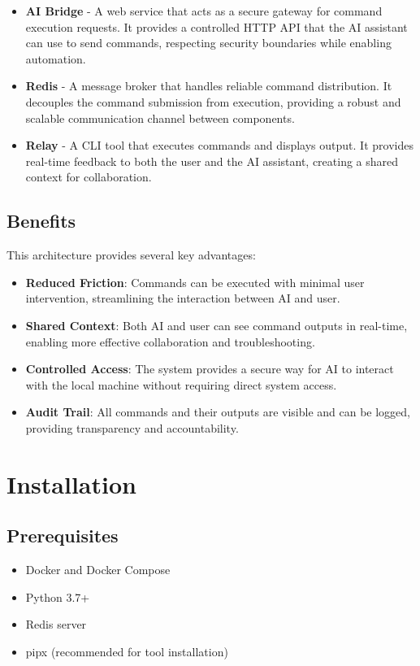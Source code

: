 \documentclass{article}
\begin{document}
\begin{itemize}
    \item \textbf{AI Bridge} - A web service that acts as a secure gateway for command execution requests. It provides a controlled HTTP API that the AI assistant can use to send commands, respecting security boundaries while enabling automation.
    
    \item \textbf{Redis} - A message broker that handles reliable command distribution. It decouples the command submission from execution, providing a robust and scalable communication channel between components.
    
    \item \textbf{Relay} - A CLI tool that executes commands and displays output. It provides real-time feedback to both the user and the AI assistant, creating a shared context for collaboration.
\end{itemize}

\subsection{Benefits}
This architecture provides several key advantages:

\begin{itemize}
    \item \textbf{Reduced Friction}: Commands can be executed with minimal user intervention, streamlining the interaction between AI and user.
    
    \item \textbf{Shared Context}: Both AI and user can see command outputs in real-time, enabling more effective collaboration and troubleshooting.
    
    \item \textbf{Controlled Access}: The system provides a secure way for AI to interact with the local machine without requiring direct system access.
    
    \item \textbf{Audit Trail}: All commands and their outputs are visible and can be logged, providing transparency and accountability.
\end{itemize}

\section{Installation}

\subsection{Prerequisites}
\begin{itemize}
    \item Docker and Docker Compose
    \item Python 3.7+
    \item Redis server
    \item pipx (recommended for tool installation)
\end{itemize}
\end{document}
